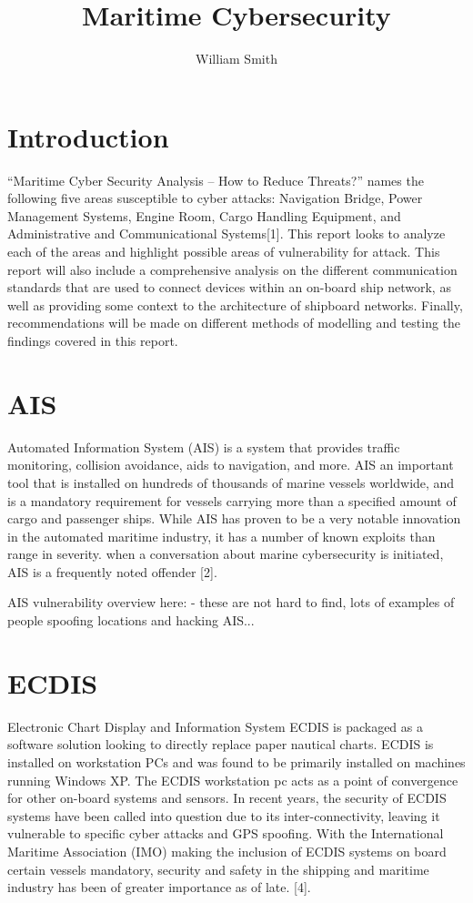 \documentclass{article}
\title{Maritime Cybersecurity}
\author{William Smith}
\begin{document}
\maketitle
\begin{abstract}
\end{abstract}


\section{Introduction}
“Maritime Cyber Security Analysis – How to Reduce Threats?” names the following five areas susceptible to cyber attacks: Navigation Bridge, Power Management Systems, Engine Room, Cargo Handling Equipment, and Administrative and Communicational Systems[1]. This report looks to analyze each of the areas and highlight possible areas of vulnerability for attack. This report will also include a comprehensive analysis on the different  communication standards that are used to connect devices within an on-board ship network, as well as providing some context to the architecture of shipboard networks. Finally, recommendations will be made on different methods of modelling and testing the findings covered in this report.

\section{AIS}
Automated Information System (AIS) is a system that provides traffic monitoring, collision avoidance, aids to navigation, and more. AIS an important tool that is installed on hundreds of thousands of marine vessels worldwide, and is a mandatory requirement for vessels carrying more than a specified amount of cargo and passenger ships. While AIS has proven to be a very notable innovation in the automated maritime industry, it has a number of known exploits than range in severity. when a conversation about marine cybersecurity is initiated, AIS is a frequently noted offender [2]. 

AIS vulnerability overview here:
- these are not hard to find, lots of examples of people spoofing locations and hacking AIS...


\section{ECDIS}

Electronic Chart Display and Information System ECDIS is packaged as a software solution looking to directly replace paper nautical charts. ECDIS is installed on workstation PCs and was found to be primarily installed on machines running Windows XP. The ECDIS workstation pc acts as a point of convergence for other on-board systems and sensors. In recent years, the security of ECDIS systems have been called into question due to its inter-connectivity, leaving it vulnerable to specific cyber attacks and GPS spoofing. With the International Maritime Association (IMO) making the inclusion of ECDIS systems on board certain vessels mandatory, security and safety in the shipping and maritime industry has been of greater importance as of late. [4]. 
\end{document}
